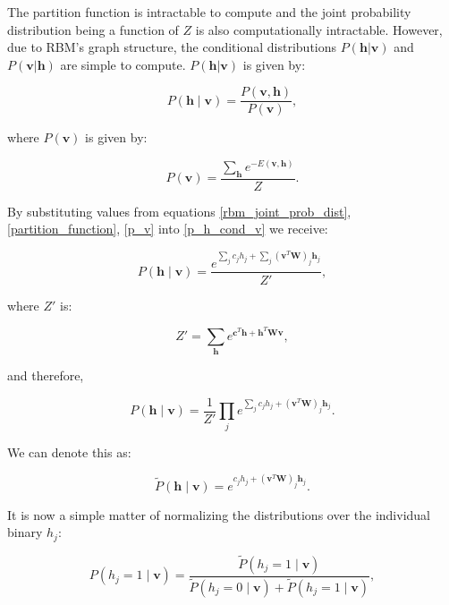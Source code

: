 \documentclass[a4paper,12pt]{article}
\begin{document}
\noindent The partition function is intractable to compute and the joint probability distribution being a function of $Z$ is also computationally intractable. However, due to RBM's graph structure, the conditional distributions $P(\mathbf{h}|\mathbf{v})$ and $P(\mathbf{v}|\mathbf{h})$ are simple to compute. $P(\mathbf{h}|\mathbf{v})$ is given by:

\begin{equation}\label{p_h_cond_v}
    P(\mathbf{h} \mid \mathbf{v}) =\frac{P(\mathbf{v},\mathbf{h})}{P(\mathbf{v})},
\end{equation}

\noindent where $P(\mathbf{v})$ is given by:

\begin{equation}\label{p_v}
    P(\mathbf{v}) = \frac{\sum_\mathbf{h} e^{-E(\mathbf{v},\mathbf{h})}}{Z}.
\end{equation}

\noindent By substituting values from equations \eqref{rbm_joint_prob_dist}, \eqref{partition_function}, \eqref{p_v} into \eqref{p_h_cond_v} we receive:

\begin{equation}
    P(\mathbf{h} \mid \mathbf{v}) = \frac{e^{\sum_j c_j h_j + \sum_j (\mathbf{v}^T \mathbf{W})_j \mathbf{h}_j}}{Z'},
\end{equation}

\noindent where $Z'$ is:

\begin{equation}
    Z' = \sum_\mathbf{h} e^{\mathbf{c}^T \mathbf{h} + \mathbf{h}^T \mathbf{W}\mathbf{v}},
\end{equation}

\noindent and therefore,

\begin{equation}
    P(\mathbf{h} \mid \mathbf{v}) = \frac{1}{Z'} \prod_j e^{\sum_j c_j h_j + (\mathbf{v}^T \mathbf{W})_j \mathbf{h}_j}.
\end{equation}

\noindent We can denote this as:

\begin{equation}
    \tilde{P}(\mathbf{h} \mid \mathbf{v}) = e^{c_j h_j + (\mathbf{v}^T \mathbf{W})_j \mathbf{h}_j}.
\end{equation}

\noindent It is now a simple matter of normalizing the distributions over the individual binary $h_j$:

\begin{equation}
    P(h_j=1 \mid \mathbf{v}) = \frac{\tilde{P}(h_j=1 \mid \mathbf{v})}{\tilde{P}(h_j=0 \mid \mathbf{v}) + \tilde{P}(h_j=1 \mid \mathbf{v})},
\end{equation}
\end{document}
